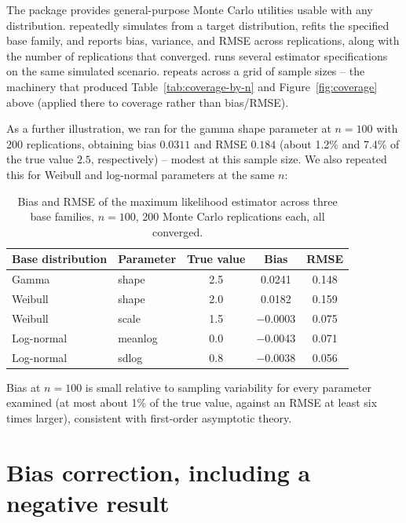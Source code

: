 \documentclass[article]{jss}
\begin{document}
The package provides general-purpose Monte Carlo utilities usable with any  distribution.  repeatedly simulates from a target distribution, refits the specified base family, and reports bias, variance, and RMSE across replications, along with the number of replications that converged.  runs several estimator specifications on the same simulated scenario.  repeats  across a grid of sample sizes -- the machinery that produced Table~\ref{tab:coverage-by-n} and Figure~\ref{fig:coverage} above (applied there to coverage rather than bias/RMSE).

As a further illustration, we ran  for the gamma shape parameter at $n=100$ with 200 replications, obtaining bias $0.0311$ and RMSE $0.184$ (about 1.2\% and 7.4\% of the true value $2.5$, respectively) -- modest at this sample size. We also repeated this for Weibull and log-normal parameters at the same $n$:

\begin{table}[htbp]
\centering
\begin{tabular}{@{}llccc@{}}
\toprule
Base distribution & Parameter & True value & Bias & RMSE \\
\midrule
Gamma & shape & 2.5 & 0.0241 & 0.148 \\
Weibull & shape & 2.0 & 0.0182 & 0.159 \\
Weibull & scale & 1.5 & $-$0.0003 & 0.075 \\
Log-normal & meanlog & 0.0 & $-$0.0043 & 0.071 \\
Log-normal & sdlog & 0.8 & $-$0.0038 & 0.056 \\
\bottomrule
\end{tabular}
\caption{Bias and RMSE of the maximum likelihood estimator across three base families, $n=100$, 200 Monte Carlo replications each, all converged.}
\label{tab:mc-three-families}
\end{table}

Bias at $n=100$ is small relative to sampling variability for every parameter examined (at most about 1\% of the true value, against an RMSE at least six times larger), consistent with first-order asymptotic theory.

\section{Bias correction, including a negative result}
\label{sec:bias}
\end{document}
